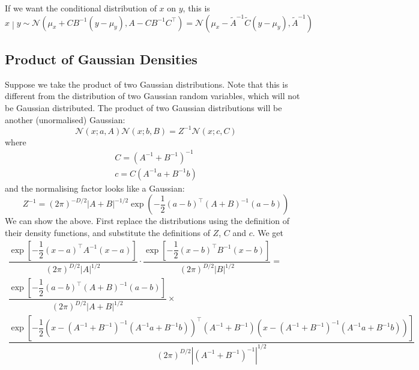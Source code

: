 \documentclass[11pt]{report} %
\begin{document}
If we want the conditional distribution of $x$ on $y$, this is
\begin{equation}
\left.x\middle|y\right.\sim\mathcal{N}\left(\mu_{x}+CB^{-1}\left(y-\mu_{y}\right),A-CB^{-1}C^{\top}\right) =\mathcal{N}\left(\mu_{x}-\tilde{A}^{-1}\tilde{C}\left(y-\mu_{y}\right),\tilde{A}^{-1}\right)
\end{equation}

\subsection{Product of Gaussian Densities}
Suppose we take the product of two Gaussian distributions. Note that this is different from the distribution of two Gaussian random variables, which will not be Gaussian distributed. The product of two Gaussian distributions will be another (unormalised) Gaussian:
\begin{equation}
\mathcal{N}\left(x; a,A\right)\mathcal{N}\left(x;b,B\right)=Z^{-1}\mathcal{N}\left(x;c,C\right)
\end{equation}
where
\begin{gather}
C=\left(A^{-1}+B^{-1}\right)^{-1} \\
c=C\left(A^{-1}a+B^{-1}b\right)
\end{gather}
and the normalising factor looks like a Gaussian:
\begin{equation}
Z^{-1}=\left(2\pi\right)^{-D/2}\left|A+B\right|^{-1/2}\exp\left(-\dfrac{1}{2}\left(a-b\right)^{\top}\left(A+B\right)^{-1}\left(a-b\right)\right)
\end{equation}
We can show the above. First replace the distributions using the definition of their density functions, and substitute the definitions of $Z$, $C$ and $c$. We get
\begin{multline}
\dfrac{\exp\left[-\dfrac{1}{2}\left(x-a\right)^{\top}A^{-1}\left(x-a\right)\right]}{\left(2\pi\right)^{D/2}\left|A\right|^{1/2}}\cdot\dfrac{\exp\left[-\dfrac{1}{2}\left(x-b\right)^{\top}B^{-1}\left(x-b\right)\right]}{\left(2\pi\right)^{D/2}\left|B\right|^{1/2}} = \\
\dfrac{\exp\left[-\dfrac{1}{2}\left(a-b\right)^{\top}\left(A+B\right)^{-1}\left(a-b\right)\right]}{\left(2\pi\right)^{D/2}\left|A+B\right|^{1/2}}\times \\
\dfrac{\exp\left[-\dfrac{1}{2}\left(x-\left(A^{-1}+B^{-1}\right)^{-1}\left(A^{-1}a+B^{-1}b\right)\right)^{\top}\left(A^{-1}+B^{-1}\right)\left(x-\left(A^{-1}+B^{-1}\right)^{-1}\left(A^{-1}a+B^{-1}b\right)\right)\right]}{\left(2\pi\right)^{D/2}\left|\left(A^{-1}+B^{-1}\right)^{-1}\right|^{1/2}}
\end{multline}
\end{document}
